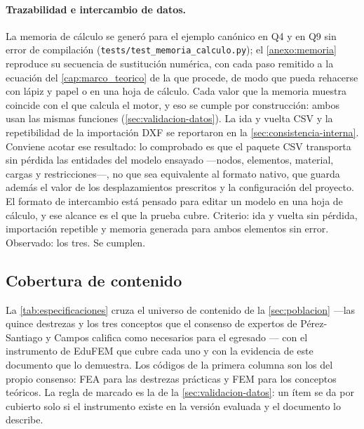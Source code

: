 \paragraph{Trazabilidad e intercambio de datos.} La memoria de cálculo se generó para el ejemplo canónico en Q4 y en Q9 sin error de compilación (\texttt{tests/test\_memoria\_calculo.py}); el \autoref{anexo:memoria} reproduce su secuencia de sustitución numérica, con cada paso remitido a la ecuación del \autoref{cap:marco_teorico} de la que procede, de modo que pueda rehacerse con lápiz y papel o en una hoja de cálculo. Cada valor que la memoria muestra coincide con el que calcula el motor, y eso se cumple por construcción: ambos usan las mismas funciones (\autoref{sec:validacion-datos}). La ida y vuelta CSV y la repetibilidad de la importación DXF se reportaron en la \autoref{sec:consistencia-interna}. Conviene acotar ese resultado: lo comprobado es que el paquete CSV transporta sin pérdida las entidades del modelo ensayado —nodos, elementos, material, cargas y restricciones—, no que sea equivalente al formato nativo, que guarda además el valor de los desplazamientos prescritos y la configuración del proyecto. El formato de intercambio está pensado para editar un modelo en una hoja de cálculo, y ese alcance es el que la prueba cubre. Criterio: ida y vuelta sin pérdida, importación repetible y memoria generada para ambos elementos sin error. Observado: los tres. Se cumplen.

\subsection{Cobertura de contenido}
\label{sec:contenido-didactico}

La \autoref{tab:especificaciones} cruza el universo de contenido de la \autoref{sec:poblacion} —las quince destrezas y los tres conceptos que el consenso de expertos de Pérez-Santiago y Campos califica como necesarios para el egresado \autocite[pp.~1162-1163]{perezsantiago2023fem}— con el instrumento de EduFEM que cubre cada uno y con la evidencia de este documento que lo demuestra. Los códigos de la primera columna son los del propio consenso: FEA para las destrezas prácticas y FEM para los conceptos teóricos. La regla de marcado es la de la \autoref{sec:validacion-datos}: un ítem se da por cubierto solo si el instrumento existe en la versión evaluada y el documento lo describe.

